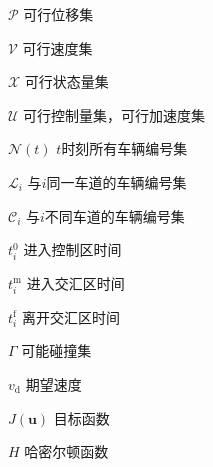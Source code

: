 \begin{denotation}[3cm]
\item[$\mathcal{P}$] 可行位移集
\item[$\mathcal{V}$] 可行速度集
\item[$\mathcal{X}$] 可行状态量集
\item[$\mathcal{U}$] 可行控制量集，可行加速度集
\item[$\mathcal{N}(t)$] $t$时刻所有车辆编号集
\item[$\mathcal{L}_i$] 与$i$同一车道的车辆编号集
\item[$\mathcal{C}_i$] 与$i$不同车道的车辆编号集
\item[$t_i^0$] 进入控制区时间
\item[$t_i^\mathrm{m}$] 进入交汇区时间
\item[$t_i^\mathrm{f}$] 离开交汇区时间
\item[$\Gamma$] 可能碰撞集
\item[$v_\mathrm{d}$] 期望速度
\item[$J(\bm{u})$] 目标函数
\item[$H$] 哈密尔顿函数
\end{denotation}
